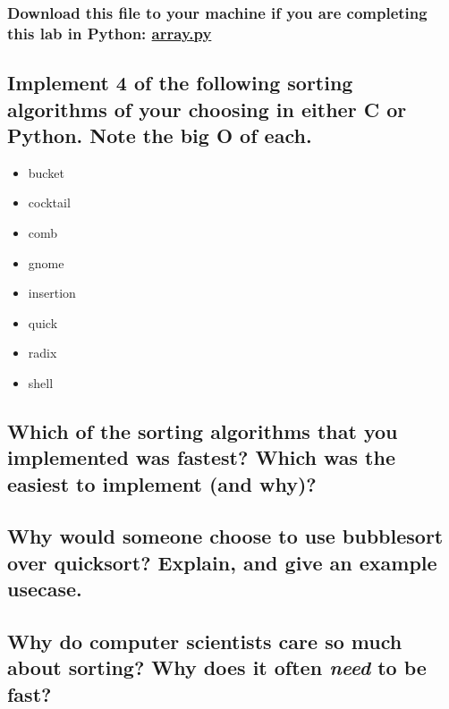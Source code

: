 \documentclass{article}
\begin{document}
\subsubsection{Download this file to your machine if you are completing this lab in Python: \href{https://github.com/ehawkvu/ds-n-a/blob/master/sorting/python/array.py}{array.py}}

\subsection{Implement 4 of the following sorting algorithms of your choosing in either C or Python. Note the big O of each.}

\begin{itemize}
\item bucket
\item cocktail
\item comb
\item gnome
\item insertion
\item quick
\item radix
\item shell
\end{itemize}


\subsection{Which of the sorting algorithms that you implemented was fastest? Which was the easiest to implement (and why)?}

\vspace{144pt}

\subsection{Why would someone choose to use bubblesort over quicksort? Explain, and give an example usecase.}

\vspace{144pt}

\subsection{Why do computer scientists care so much about sorting? Why does it often \textit{need} to be fast?}

\vspace{144pt}
\end{document}
